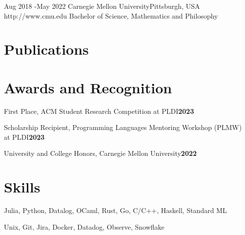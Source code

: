 \documentclass[11pt]{article} %
\begin{document}
\education
{Aug 2018 -}{May 2022}
{Carnegie Mellon University}{Pittsburgh, USA}
{http://www.cmu.edu}
{Bachelor of Science, Mathematics and Philosophy}

\section{Publications}

{\small
\setlength{\bibitemsep}{1pt}
\printbibliography[heading=none]}


\section{Awards and Recognition}

\noindent First Place, ACM Student Research Competition at PLDI\hfill\textbf{2023}\par
\noindent Scholarship Recipient, Programming Languages Mentoring Workshop (PLMW) at PLDI\hfill\textbf{2023}\par
\noindent University and College Honors, Carnegie Mellon University\hfill\textbf{2022}\par


\section{Skills}

\begin{description}\setlength{\itemsep}{2pt}\setlength{\parskip}{0pt}\setlength{\topsep}{0pt}
    \item[Programming languages:] Julia, Python, Datalog, OCaml, Rust, Go, C/C++, Haskell, Standard ML
    \item[Tools:] Unix, Git, Jira, Docker, Datadog, Observe, Snowflake
\end{description}
\end{document}
